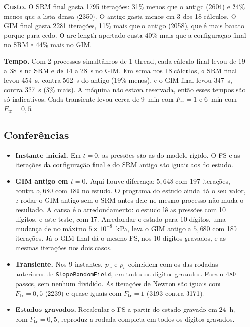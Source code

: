 \documentclass[11pt,a4paper]{article}
\numberwithin{equation}{section}
\begin{document}
\textbf{Custo.} O SRM final gasta 1795 iterações: 31\% menos que o antigo (2604) e 24\% menos que a lista densa (2350). O antigo gasta menos em 3 dos 18 cálculos. O GIM final gasta 2281 iterações, 11\% mais que o antigo (2058), que é mais barato porque para cedo. O arc-length apertado custa 40\% mais que a configuração final no SRM e 44\% mais no GIM.

\textbf{Tempo.} Com 2 processos simultâneos de 1 thread, cada cálculo final levou de 19 a 38~s no SRM e de 14 a 28~s no GIM. Em soma nos 18 cálculos, o SRM final levou 454~s, contra 562~s do antigo (19\% menos), e o GIM final levou 347~s, contra 337~s (3\% mais). A máquina não estava reservada, então esses tempos são só indicativos. Cada transiente levou cerca de 9~min com $F_{\mathrm{tr}} = 1$ e 6~min com $F_{\mathrm{tr}} = 0{,}5$.

\subsection{Conferências}\label{sec:acoplado_conf}

\begin{itemize}
\item \textbf{Instante inicial.} Em $t = 0$, as pressões são as do modelo rígido. O FS e as iterações da configuração final e do SRM antigo são iguais aos do estudo.
\item \textbf{GIM antigo em $t = 0$.} Aqui houve diferença: $5{,}648$ com 197 iterações, contra $5{,}680$ com 180 no estudo. O programa do estudo ainda dá o seu valor, e rodar o GIM antigo sem o SRM antes dele no mesmo processo não muda o resultado. A causa é o arredondamento: o estudo lê as pressões com 10 dígitos, e este teste, com 17. Arredondar o estado para 10 dígitos, uma mudança de no máximo $5\times10^{-8}$~kPa, leva o GIM antigo a $5{,}680$ com 180 iterações. Já o GIM final dá o mesmo FS, nos 10 dígitos gravados, e as mesmas iterações nos dois casos.
\item \textbf{Transiente.} Nos 9 instantes, $p_w$ e $p_a$ coincidem com os das rodadas anteriores de \texttt{SlopeRandomField}, em todos os dígitos gravados. Foram 480 passos, sem nenhum dividido. As iterações de Newton são iguais com $F_{\mathrm{tr}} = 0{,}5$ (2239) e quase iguais com $F_{\mathrm{tr}} = 1$ (3193 contra 3171).
\item \textbf{Estados gravados.} Recalcular o FS a partir do estado gravado em 24~h, com $F_{\mathrm{tr}} = 0{,}5$, reproduz a rodada completa em todos os dígitos gravados.
\end{itemize}
\end{document}
